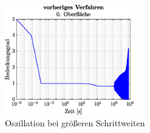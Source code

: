 \documentclass{listhesis}
\begin{document}
\begin{figure}[]
\centering
\includegraphics[width=0.5\textwidth]{./include/figure_5.0/old/CovFacet0.eps} 
\caption{Oszillation bei größeren Schrittweiten}
\label{fig:oscillation}
\end{figure}
\end{document}
